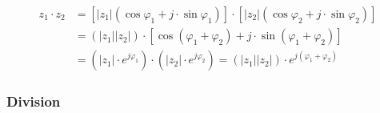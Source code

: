 												
				\begin{align*}
					z_1 \cdot z_2 &= \left[ \left| z_1 \right| \left( \cos \varphi_1 + j \cdot \sin \varphi_1 \right) \right] \cdot 
													 \left[ \left| z_2 \right| \left( \cos \varphi_2 + j \cdot \sin \varphi_2 \right) \right]
					\\
					&= \left( \left| z_1 \right| \left| z_2 \right| \right) \cdot \left[ \cos \left( \varphi_1 + \varphi_2 \right) +  
					j \cdot \sin \left(	\varphi_1 + \varphi_2 \right) \right]
					\\
					&= \left( \left| z_1 \right| \cdot e^{j \varphi_1} \right) \cdot \left( \left| z_2 \right| \cdot e^{j \varphi_2} \right)
					= \left( \left| z_1 \right| \left| z_2 \right| \right) \cdot e^{j \left( \varphi_1 + \varphi_2 \right)}
				\end{align*}
			
			\vspace{10mm}	
			\subsubsection*{Division}
			
				
					\begin{center}
						
					\end{center}
				
